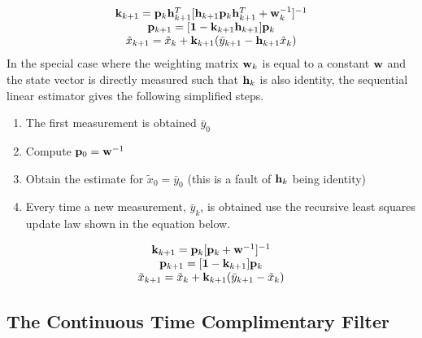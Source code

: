 \begin{equation}
  \begin{matrix}
    {\bf k}_{k+1} = {\bf p}_{k}{\bf h}_{k+1}^T[{\bf h}_{k+1}{\bf p}_k{\bf h}_{k+1}^T+{\bf w}_k^{-1}]^{-1}\\
    {\bf p}_{k+1} = [{\bf 1} - {\bf k}_{k+1}{\bf h}_{k+1}]{\bf p}_k\\
    \tilde{x}_{k+1} = \tilde{x}_k + {\bf k}_{k+1}(\bar{y}_{k+1} - {\bf h}_{k+1}\tilde{x}_k) \\
  \end{matrix}
\end{equation}
In the special case where the weighting matrix
${\bf w}_k$ is equal to a constant ${\bf w}$ and the state vector is
directly measured such that ${\bf h}_k$ is also identity, the 
sequential linear estimator gives the following simplified steps.
\begin{enumerate}[itemsep=-5pt]
    \item The first measurement is obtained $\bar{y}_0$
    \item Compute ${\bf p}_0 = {\bf w}^{-1}$
    \item Obtain the estimate for $\tilde{x}_0 = \bar{y}_0$ (this is a fault of ${\bf h}_k$ being identity) 
    \item Every time a new measurement, $\bar{y}_k$, is obtained use the recursive least squares update law shown in the equation below.  
\end{enumerate}
\begin{equation}
  \begin{matrix}
    {\bf k}_{k+1} = {\bf p}_k[{\bf p}_k + {\bf w}^{-1}]^{-1}\\ 
    {\bf p}_{k+1} = [{\bf 1} - {\bf k}_{k+1}]{\bf p}_k\\
    \tilde{x}_{k+1} = \tilde{x}_k + {\bf k}_{k+1}(\bar{y}_{k+1} - \tilde{x}_k) \\
  \end{matrix}
\end{equation}

\subsection{The Continuous Time Complimentary Filter}

